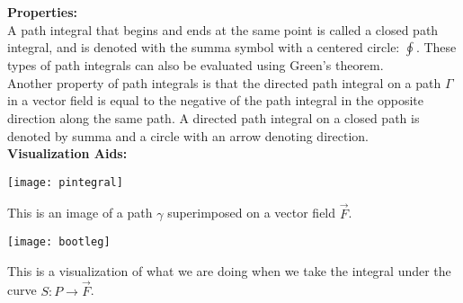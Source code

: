 \documentclass[12pt]{article}
\begin{document}
\textbf{Properties:}\\
A path integral that begins and ends at the same point is called a closed path integral, and is denoted with the summa symbol with a centered circle: $\oint$. These types of path integrals can also be evaluated using Green's theorem.\\
Another property of path integrals is that the directed path integral on a path $\Gamma$ in a vector field is equal to the negative of the path integral in the opposite direction along the same path. A directed path integral on a closed path is denoted by summa and a circle with an arrow denoting direction.\\

\textbf{Visualization Aids:}
\begin{center}
\texttt{[image: pintegral]}
\end{center}
This is an image of a path $\gamma$ superimposed on a vector field $\vec{F}$.
\begin{center}
\texttt{[image: bootleg]}
\end{center}
This is a visualization of what we are doing when we take the integral under the curve $S:P\rightarrow\vec{F}$.
\end{document}

